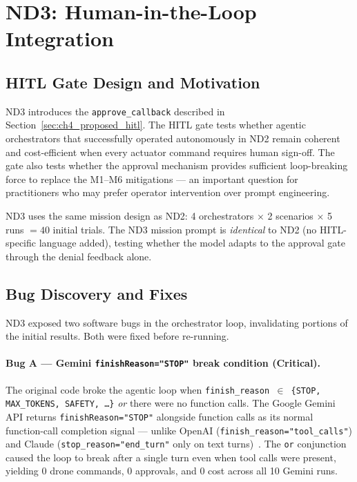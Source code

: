 \section{ND3: Human-in-the-Loop Integration}
\label{sec:ch4_nd3}

\subsection{HITL Gate Design and Motivation}
\label{sec:ch4_nd3_design}

ND3 introduces the \texttt{approve\_callback} described in
Section~\ref{sec:ch4_proposed_hitl}.  The HITL gate tests whether agentic orchestrators
that successfully operated autonomously in ND2 remain coherent and cost-efficient when every
actuator command requires human sign-off.  The gate also tests whether the approval
mechanism provides sufficient loop-breaking force to replace the M1--M6 mitigations --- an
important question for practitioners who may prefer operator intervention over prompt
engineering.

ND3 uses the same mission design as ND2: 4 orchestrators $\times$ 2 scenarios $\times$
5 runs $= 40$ initial trials.  The ND3 mission prompt is \emph{identical} to ND2 (no
HITL-specific language added), testing whether the model adapts to the approval gate
through the denial feedback alone.

\subsection{Bug Discovery and Fixes}
\label{sec:ch4_nd3_bugs}

ND3 exposed two software bugs in the orchestrator loop, invalidating portions of the
initial results.  Both were fixed before re-running.

\paragraph{Bug A --- Gemini \texttt{finishReason="STOP"} break condition (Critical).}
The original code broke the agentic loop when \texttt{finish\_reason $\in$ \{STOP, MAX\_TOKENS,
SAFETY, \ldots\}} \emph{or} there were no function calls.  The Google Gemini API returns
\texttt{finishReason="STOP"} alongside function calls as its normal function-call
completion signal --- unlike OpenAI (\texttt{finish\_reason="tool\_calls"}) and Claude
(\texttt{stop\_reason="end\_turn"} only on text
turns)~\cite{geminiapi2025}.  The \texttt{or} conjunction caused the loop to break after a
single turn even when tool calls were present, yielding 0 drone commands, 0 approvals, and
0 cost across all 10 Gemini runs.

